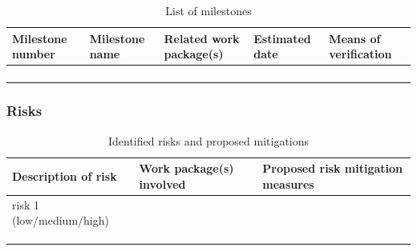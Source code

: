 \documentclass[]{article}
\begin{document}
\begin{table}[!htbp]
\caption{List of milestones}
\centering
\begin{tabular}{@{}lllll@{}}
\toprule
\textbf{Milestone number} & \textbf{Milestone name} & \textbf{Related work package(s)} & \textbf{Estimated date} & \textbf{Means of verification} \\ \midrule
                          &                         &                                  &                         &                                \\
                          &                         &                                  &                         &                                \\
                          &                         &                                  &                         &                                \\
                          &                         &                                  &                         &                                \\ \bottomrule
\end{tabular}
\end{table}


\subsubsection{Risks}\label{risks}

\begin{table}[!htbp]
\caption{Identified risks and proposed mitigations}
\centering
\begin{tabular}{@{}lll@{}}
\toprule
\textbf{Description of risk} & \textbf{Work package(s) involved} & \textbf{Proposed risk mitigation measures} \\ \midrule
risk 1 (low/medium/high)     &                                   &                                            \\
                             &                                   &                                            \\
                             &                                   &                                            \\
                             &                                   &                                            \\ \bottomrule
\end{tabular}
\end{table}
\end{document}
